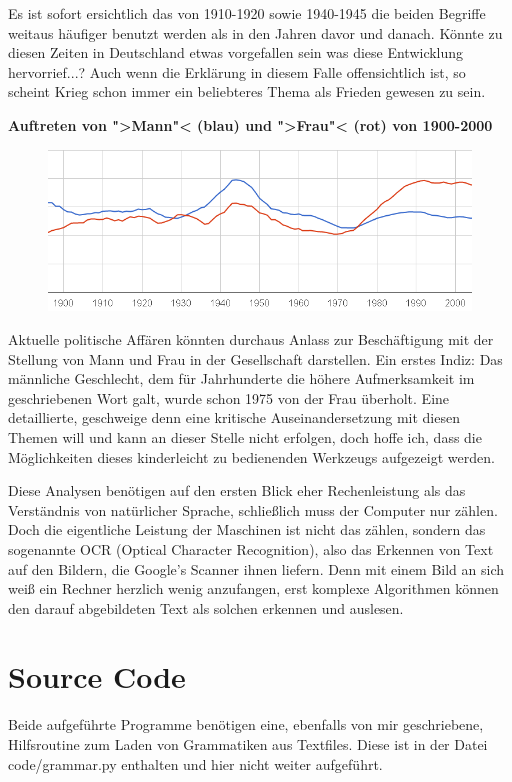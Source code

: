 \documentclass[12pt,a4paper]{article}
\theoremstyle{definition}
\begin{document}
		Es ist sofort ersichtlich das von 1910-1920 sowie 1940-1945 die beiden Begriffe weitaus häufiger benutzt werden als in den Jahren davor und danach. Könnte zu diesen Zeiten in Deutschland etwas vorgefallen sein was diese Entwicklung hervorrief...? Auch wenn die Erklärung in diesem Falle offensichtlich ist, so scheint Krieg schon immer ein beliebteres Thema als Frieden gewesen zu sein.
		
		\textbf{Auftreten von ">Mann"< (blau) und ">Frau"< (rot) von 1900-2000}
		\begin{figure}[hbtp]
		\centering
		\includegraphics[width=\linewidth]{Grafiken/Mann-vs-Frau}
		\end{figure}
		
		Aktuelle politische Affären könnten durchaus Anlass zur Beschäftigung mit der Stellung von Mann und Frau in der Gesellschaft darstellen. Ein erstes Indiz: Das männliche Geschlecht, dem für Jahrhunderte die höhere Aufmerksamkeit im geschriebenen Wort galt, wurde schon 1975 von der Frau überholt. Eine detaillierte, geschweige denn eine kritische Auseinandersetzung mit diesen Themen will und kann an dieser Stelle nicht erfolgen, doch hoffe ich, dass die Möglichkeiten dieses kinderleicht zu bedienenden Werkzeugs aufgezeigt werden.
		
		Diese Analysen benötigen auf den ersten Blick eher Rechenleistung als das Verständnis von natürlicher Sprache, schließlich muss der Computer nur zählen. Doch die eigentliche Leistung der Maschinen ist nicht das zählen, sondern das sogenannte OCR (Optical Character Recognition), also das Erkennen von Text auf den Bildern, die Google's Scanner ihnen liefern. Denn mit einem Bild an sich weiß ein Rechner herzlich wenig anzufangen, erst komplexe Algorithmen können den darauf abgebildeten Text als solchen erkennen und auslesen.

\section{Source Code}
	Beide aufgeführte Programme benötigen eine, ebenfalls von mir geschriebene, Hilfsroutine zum Laden von Grammatiken aus Textfiles. Diese ist in der Datei code/grammar.py enthalten und hier nicht weiter aufgeführt.
\end{document}
